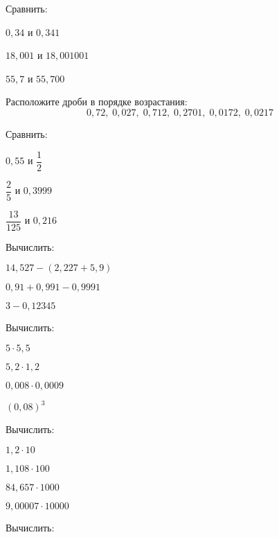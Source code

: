 %
%
\begin{class}[number=7]
	\begin{listofex}
		\item Сравнить:
		\begin{enumcols}[itemcolumns=3]
			\item \( 0,34 \) и \( 0,341 \)
			\item \( 18,001 \) и \( 18,001001 \)
			\item \( 55,7 \) и \( 55,700 \)
		\end{enumcols}
		\item Расположите дроби в порядке возрастания:
		\[ 0,72,\;0,027,\;0,712,\;0,2701,\;0,0172,\;0,0217 \]
		\item Сравнить:
		\begin{enumcols}[itemcolumns=3]
			\item \( 0,55 \) и \( \dfrac{1}{2} \)
			\item \( \dfrac{2}{5} \) и \( 0,3999 \)
			\item \( \dfrac{13}{125} \) и \( 0,216 \)
		\end{enumcols}
		\item Вычислить:
		\begin{enumcols}[itemcolumns=3]
			\item \( 14,527-(2,227+5,9) \)
			\item \( 0,91+0,991-0,9991 \)
			\item \( 3-0,12345 \)
		\end{enumcols}
		\item Вычислить:
		\begin{enumcols}[itemcolumns=4]
			\item \( 5\cdot5,5 \)
			\item \( 5,2\cdot1,2 \)
			\item \( 0,008\cdot0,0009 \)
			\item \( (0,08)^3 \)
		\end{enumcols}
		\item Вычислить:
		\begin{enumcols}[itemcolumns=4]
			\item \( 1,2\cdot10 \)
			\item \( 1,108\cdot100 \)
			\item \( 84,657\cdot1000 \)
			\item \( 9,00007\cdot10000 \)
		\end{enumcols}
		\item Вычислить:
		\begin{enumcols}[itemcolumns=4]

\end{enumcols}
\end{listofex}
\end{class}
